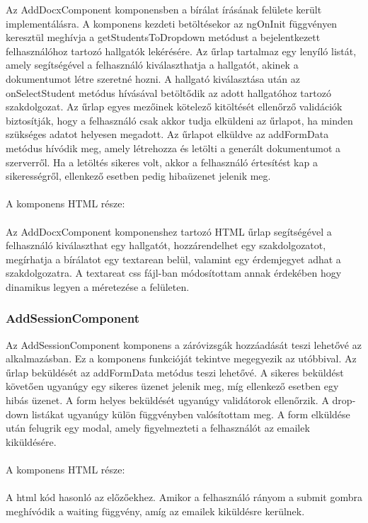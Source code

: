 Az AddDocxComponent komponensben a bírálat írásának felülete került implementálásra. A komponens kezdeti betöltésekor az ngOnInit függvényen keresztül meghívja a getStudentsToDropdown metódust a bejelentkezett felhasználóhoz tartozó hallgatók lekérésére. Az űrlap tartalmaz egy lenyíló listát, amely segítségével a felhasználó kiválaszthatja a hallgatót, akinek a dokumentumot létre szeretné hozni. A hallgató kiválasztása után az onSelectStudent metódus hívásával betöltődik az adott hallgatóhoz tartozó szakdolgozat. Az űrlap egyes mezőinek kötelező kitöltését ellenőrző validációk biztosítják, hogy a felhasználó csak akkor tudja elküldeni az űrlapot, ha minden szükséges adatot helyesen megadott. Az űrlapot elküldve az addFormData metódus hívódik meg, amely létrehozza és letölti a generált dokumentumot a szerverről. Ha a letöltés sikeres volt, akkor a felhasználó értesítést kap a sikerességről, ellenkező esetben pedig hibaüzenet jelenik meg.\\
\\
A komponens HTML része:\\
\\
Az AddDocxComponent komponenshez tartozó HTML űrlap segítségével a felhasználó kiválaszthat egy hallgatót, hozzárendelhet egy szakdolgozatot, megírhatja a bírálatot egy textarean belül, valamint  egy érdemjegyet adhat a szakdolgozatra. A textareat css fájl-ban módosítottam annak érdekében hogy dinamikus legyen a méretezése a felületen.

\subsubsection{AddSessionComponent}

Az AddSessionComponent komponens a záróvizsgák hozzáadását teszi lehetővé az alkalmazásban. Ez a komponens funkcióját tekintve megegyezik az utóbbival. Az űrlap beküldését az addFormData metódus teszi lehetővé. A sikeres beküldést követően ugyanúgy egy sikeres üzenet jelenik meg, míg ellenkező esetben egy hibás üzenet. A form helyes beküldését ugyanúgy validátorok ellenőrzik. A drop-down listákat ugyanúgy külön függvényben valósítottam meg. A form elküldése után felugrik egy modal, amely figyelmezteti a felhasználót az emailek kiküldésére.\\
\\
A komponens HTML része:\\
\\
A html kód hasonló az előzőekhez. Amikor a felhasználó rányom a submit gombra meghívódik a waiting függvény, amíg az emailek kiküldésre kerülnek.


